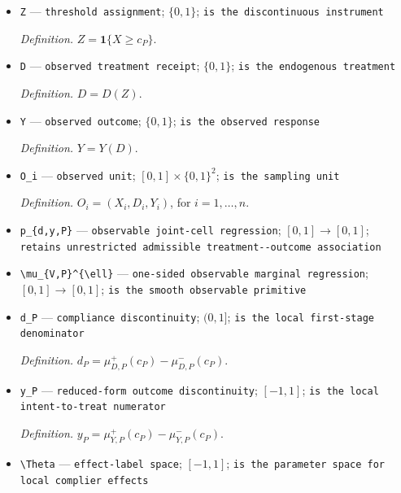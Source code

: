 \documentclass{article}
\begin{document}
\begin{itemize}
  \par\smallskip\noindent\emph{Definition.} A law of \(X\), \(R\), \(D(z)\), and \(Y(d)\) under threshold assignment at \(c_P\), monotone compliance, consistency, and exclusion.
  \item \texttt{Z} --- \texttt{threshold assignment}; \(\{0,1\}\); \texttt{is the discontinuous instrument}
  \par\smallskip\noindent\emph{Definition.} \(Z=\mathbf 1\{X\ge c_P\}\).
  \item \texttt{D} --- \texttt{observed treatment receipt}; \(\{0,1\}\); \texttt{is the endogenous treatment}
  \par\smallskip\noindent\emph{Definition.} \(D=D(Z)\).
  \item \texttt{Y} --- \texttt{observed outcome}; \(\{0,1\}\); \texttt{is the observed response}
  \par\smallskip\noindent\emph{Definition.} \(Y=Y(D)\).
  \item \texttt{O\_\allowbreak{}i} --- \texttt{observed unit}; \([0,1]\times\{0,1\}^2\); \texttt{is the sampling unit}
  \par\smallskip\noindent\emph{Definition.} \(O_i=(X_i,D_i,Y_i)\), for \(i=1,\ldots,n\).
  \item \texttt{p\_\allowbreak{}\{d,\allowbreak{}y,\allowbreak{}P\}\allowbreak{}} --- \texttt{observable joint-\allowbreak{}cell regression}; \([0,1]\to[0,1]\); \texttt{retains unrestricted admissible treatment-\allowbreak{}-\allowbreak{}outcome association}
  \item \texttt{\textbackslash{}\allowbreak{}mu\_\allowbreak{}\{V,\allowbreak{}P\}\allowbreak{}\textasciicircum{}\{\textbackslash{}\allowbreak{}ell\}\allowbreak{}} --- \texttt{one-\allowbreak{}sided observable marginal regression}; \([0,1]\to[0,1]\); \texttt{is the smooth observable primitive}
  \item \texttt{d\_\allowbreak{}P} --- \texttt{compliance discontinuity}; \((0,1]\); \texttt{is the local first-\allowbreak{}stage denominator}
  \par\smallskip\noindent\emph{Definition.} \(d_P=\mu_{D,P}^{+}(c_P)-\mu_{D,P}^{-}(c_P)\).
  \item \texttt{y\_\allowbreak{}P} --- \texttt{reduced-\allowbreak{}form outcome discontinuity}; \([-1,1]\); \texttt{is the local intent-\allowbreak{}to-\allowbreak{}treat numerator}
  \par\smallskip\noindent\emph{Definition.} \(y_P=\mu_{Y,P}^{+}(c_P)-\mu_{Y,P}^{-}(c_P)\).
  \item \texttt{\textbackslash{}\allowbreak{}Theta} --- \texttt{effect-\allowbreak{}label space}; \([-1,1]\); \texttt{is the parameter space for local complier effects}

\end{itemize}
\end{document}
